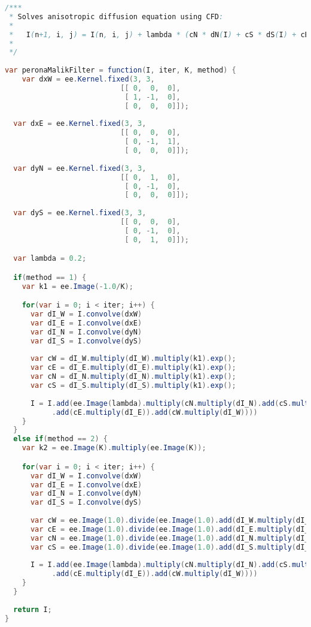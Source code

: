 \begin{lstlisting}[language=Java, basicstyle=\tiny]
/***
 * Solves anisotropic diffusion equation using CFD:
 *
 *   I(n+1, i, j) = I(n, i, j) + lambda * (cN * dN(I) + cS * dS(I) + cE * dE(I), cW * dW(I))
 *
 */
 
var peronaMalikFilter = function(I, iter, K, method) {
    var dxW = ee.Kernel.fixed(3, 3,
                           [[ 0,  0,  0],
                            [ 1, -1,  0],
                            [ 0,  0,  0]]);
  
  var dxE = ee.Kernel.fixed(3, 3,
                           [[ 0,  0,  0],
                            [ 0, -1,  1],
                            [ 0,  0,  0]]);
  
  var dyN = ee.Kernel.fixed(3, 3,
                           [[ 0,  1,  0],
                            [ 0, -1,  0],
                            [ 0,  0,  0]]);
  
  var dyS = ee.Kernel.fixed(3, 3,
                           [[ 0,  0,  0],
                            [ 0, -1,  0],
                            [ 0,  1,  0]]);

  var lambda = 0.2;

  if(method == 1) {
    var k1 = ee.Image(-1.0/K);

    for(var i = 0; i < iter; i++) {
      var dI_W = I.convolve(dxW)
      var dI_E = I.convolve(dxE)
      var dI_N = I.convolve(dyN)
      var dI_S = I.convolve(dyS)
      
      var cW = dI_W.multiply(dI_W).multiply(k1).exp();
      var cE = dI_E.multiply(dI_E).multiply(k1).exp();
      var cN = dI_N.multiply(dI_N).multiply(k1).exp();
      var cS = dI_S.multiply(dI_S).multiply(k1).exp();
  
      I = I.add(ee.Image(lambda).multiply(cN.multiply(dI_N).add(cS.multiply(dI_S))
           .add(cE.multiply(dI_E)).add(cW.multiply(dI_W))))
    }
  }
  else if(method == 2) {
    var k2 = ee.Image(K).multiply(ee.Image(K));

    for(var i = 0; i < iter; i++) {
      var dI_W = I.convolve(dxW)
      var dI_E = I.convolve(dxE)
      var dI_N = I.convolve(dyN)
      var dI_S = I.convolve(dyS)
      
      var cW = ee.Image(1.0).divide(ee.Image(1.0).add(dI_W.multiply(dI_W).divide(k2)));
      var cE = ee.Image(1.0).divide(ee.Image(1.0).add(dI_E.multiply(dI_E).divide(k2)));
      var cN = ee.Image(1.0).divide(ee.Image(1.0).add(dI_N.multiply(dI_N).divide(k2)));
      var cS = ee.Image(1.0).divide(ee.Image(1.0).add(dI_S.multiply(dI_S).divide(k2)));
  
      I = I.add(ee.Image(lambda).multiply(cN.multiply(dI_N).add(cS.multiply(dI_S))
           .add(cE.multiply(dI_E)).add(cW.multiply(dI_W))))
    }
  }
  
  return I;
}
\end{lstlisting}
